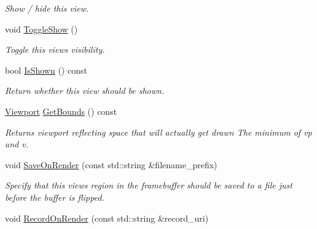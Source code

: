 \begin{DoxyCompactItemize}
\begin{DoxyCompactList}\small\item\em Show / hide this view. \end{DoxyCompactList}\item 
void \hyperlink{structpangolin_1_1_view_a5aa02cfad4320767648b9dc2dbd1e8dc}{Toggle\+Show} ()\hypertarget{structpangolin_1_1_view_a5aa02cfad4320767648b9dc2dbd1e8dc}{}\label{structpangolin_1_1_view_a5aa02cfad4320767648b9dc2dbd1e8dc}

\begin{DoxyCompactList}\small\item\em Toggle this views visibility. \end{DoxyCompactList}\item 
bool \hyperlink{structpangolin_1_1_view_adeacf774f97a5701609a51215ab2f827}{Is\+Shown} () const 
\begin{DoxyCompactList}\small\item\em Return whether this view should be shown. \end{DoxyCompactList}\item 
\hyperlink{structpangolin_1_1_viewport}{Viewport} \hyperlink{structpangolin_1_1_view_ab89972a5b0a5c2f6417b23f21fc268da}{Get\+Bounds} () const \hypertarget{structpangolin_1_1_view_ab89972a5b0a5c2f6417b23f21fc268da}{}\label{structpangolin_1_1_view_ab89972a5b0a5c2f6417b23f21fc268da}

\begin{DoxyCompactList}\small\item\em Returns viewport reflecting space that will actually get drawn The minimum of vp and v. \end{DoxyCompactList}\item 
void \hyperlink{structpangolin_1_1_view_a1189c3df354bb6a555f1126e2e2702d9}{Save\+On\+Render} (const std\+::string \&filename\+\_\+prefix)
\begin{DoxyCompactList}\small\item\em Specify that this views region in the framebuffer should be saved to a file just before the buffer is flipped. \end{DoxyCompactList}\item 
void \hyperlink{structpangolin_1_1_view_ac1160b7c3dbe5de54d2152c7c49e960e}{Record\+On\+Render} (const std\+::string \&record\+\_\+uri)\hypertarget{structpangolin_1_1_view_ac1160b7c3dbe5de54d2152c7c49e960e}{}\label{structpangolin_1_1_view_ac1160b7c3dbe5de54d2152c7c49e960e}


\end{DoxyCompactItemize}
